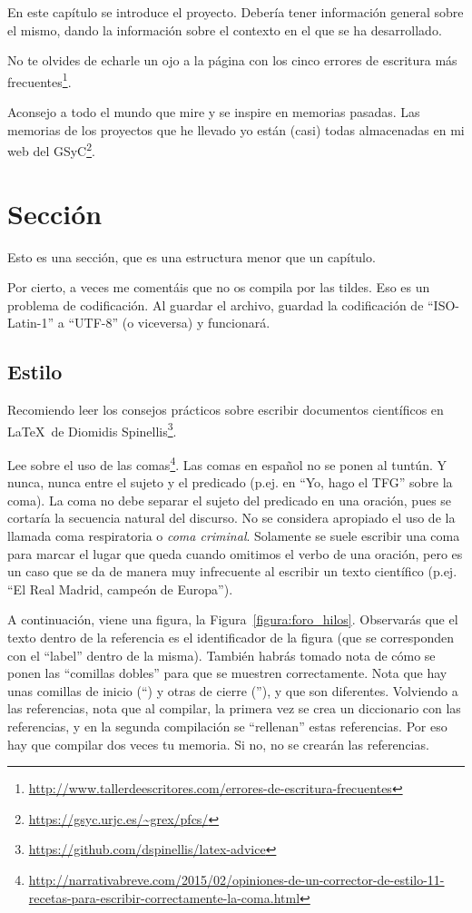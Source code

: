 \documentclass[a4paper, 12pt]{book}
\begin{document}
En este capítulo se introduce el proyecto.
Debería tener información general sobre el mismo, dando la información sobre el contexto en el que se ha desarrollado.

No te olvides de echarle un ojo a la página con los cinco errores de escritura más frecuentes\footnote{\url{http://www.tallerdeescritores.com/errores-de-escritura-frecuentes}}.

Aconsejo a todo el mundo que mire y se inspire en memorias pasadas.
Las memorias de los proyectos que he llevado yo están (casi) todas almacenadas en mi web del GSyC\footnote{\url{https://gsyc.urjc.es/~grex/pfcs/}}.

\section{Sección}
\label{sec:seccion}

Esto es una sección, que es una estructura menor que un capítulo. 

Por cierto, a veces me comentáis que no os compila por las tildes.
Eso es un problema de codificación.
Al guardar el archivo, guardad la codificación de ``ISO-Latin-1'' a ``UTF-8'' (o viceversa) y funcionará.

\subsection{Estilo}
\label{subsec:estilo}

Recomiendo leer los consejos prácticos sobre escribir documentos científicos en \LaTeX \ de Diomidis Spinellis\footnote{\url{https://github.com/dspinellis/latex-advice}}.

Lee sobre el uso de las comas\footnote{\url{http://narrativabreve.com/2015/02/opiniones-de-un-corrector-de-estilo-11-recetas-para-escribir-correctamente-la-coma.html}}. 
Las comas en español no se ponen al tuntún.
Y nunca, nunca entre el sujeto y el predicado (p.ej. en ``Yo, hago el TFG'' sobre la coma).
La coma no debe separar el sujeto del predicado en una oración, pues se cortaría la secuencia natural del discurso.
No se considera apropiado el uso de la llamada coma respiratoria o \emph{coma criminal}.
Solamente se suele escribir una coma para marcar el lugar que queda cuando omitimos el verbo de una oración, pero es un caso que se da de manera muy infrecuente al escribir un texto científico (p.ej. ``El Real Madrid, campeón de Europa'').

A continuación, viene una figura, la Figura~\ref{figura:foro_hilos}. 
Observarás que el texto dentro de la referencia es el identificador de la figura (que se corresponden con el ``label'' dentro de la misma). 
También habrás tomado nota de cómo se ponen las ``comillas dobles'' para que se muestren correctamente. 
Nota que hay unas comillas de inicio (``) y otras de cierre (''), y que son diferentes.
Volviendo a las referencias, nota que al compilar, la primera vez se crea un diccionario con las referencias, y en la segunda compilación se ``rellenan'' estas referencias. 
Por eso hay que compilar dos veces tu memoria.
Si no, no se crearán las referencias.
\end{document}
